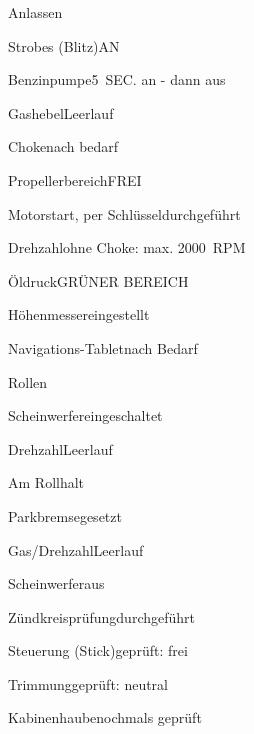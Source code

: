 \begin{checklist}{Anlassen}
	\item{Strobes (Blitz)}{AN}
	\item{Benzinpumpe}{5~SEC. an - dann aus}
	\item{Gashebel}{Leerlauf}
	\item{Choke}{nach bedarf}
	\item{Propellerbereich}{FREI}
	\item{Motorstart, per Schlüssel}{durchgeführt}
	\item{Drehzahl}{ohne Choke: max. 2000~RPM}
	\item{Öldruck}{GRÜNER BEREICH}
	\item{Höhenmesser}{eingestellt}
	\item{Navigations-Tablet}{nach Bedarf}
\end{checklist}

\begin{checklist}{Rollen}
	\item{Scheinwerfer}{eingeschaltet}
	\item{Drehzahl}{Leerlauf}
\end{checklist}

\begin{checklist}{Am Rollhalt}
	\item{Parkbremse}{gesetzt}
	\item{Gas/Drehzahl}{Leerlauf}
	\item{Scheinwerfer}{aus}
	\item{Zündkreisprüfung}{durchgeführt}
	\item{Steuerung (Stick)}{geprüft: frei}
	\item{Trimmung}{geprüft: neutral}
	\item{Kabinenhaube}{nochmals geprüft}
\end{checklist}

